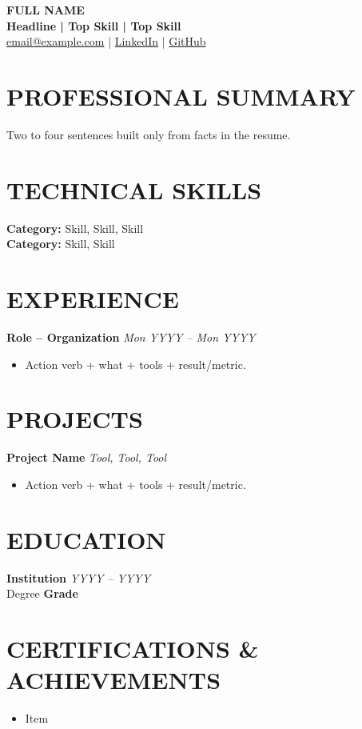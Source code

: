 \documentclass[a4paper,10pt]{article}
\begin{document}
\begin{center}
    {\LARGE \textbf{FULL NAME}}\\[4pt]
    {\normalsize \textbf{Headline | Top Skill | Top Skill}}\\[5pt]
    \small
    \href{mailto:email@example.com}{email@example.com}
    \quad | \quad \href{https://linkedin.com/in/handle}{LinkedIn}
    \quad | \quad \href{https://github.com/handle}{GitHub}
\end{center}

\section*{PROFESSIONAL SUMMARY}
Two to four sentences built only from facts in the resume.

\section*{TECHNICAL SKILLS}
\textbf{Category:} Skill, Skill, Skill\\
\textbf{Category:} Skill, Skill

\section*{EXPERIENCE}
\textbf{Role -- Organization} \hfill \textit{Mon YYYY -- Mon YYYY}
\begin{itemize}
    \item Action verb + what + tools + result/metric.
\end{itemize}

\section*{PROJECTS}
\textbf{Project Name} \hfill \textit{Tool, Tool, Tool}
\begin{itemize}
    \item Action verb + what + tools + result/metric.
\end{itemize}

\section*{EDUCATION}
\textbf{Institution} \hfill \textit{YYYY -- YYYY}\\
Degree \hfill \textbf{Grade}

\section*{CERTIFICATIONS \& ACHIEVEMENTS}
\begin{itemize}
    \item Item
\end{itemize}
\end{document}

